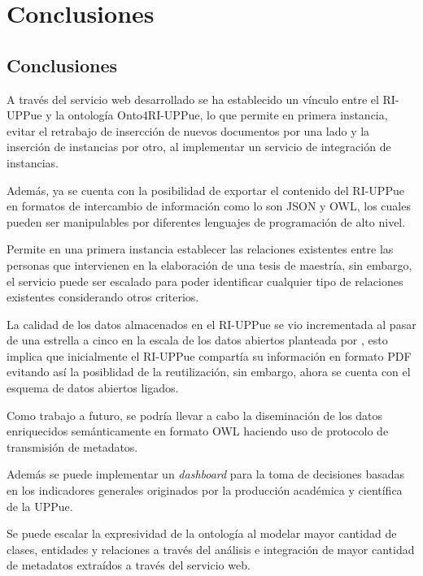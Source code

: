 \renewcommand{\chaptername}{Capitulo}
\chapter{Conclusiones} 
\section{Conclusiones}

A trav\'es del servicio web desarrollado se ha establecido un v\'inculo entre el RI-UPPue y la ontolog\'ia Onto4RI-UPPue, lo que permite en primera instancia, evitar el retrabajo de insercci\'on de nuevos documentos por una lado y la inserci\'on de instancias por otro, al implementar un servicio de integraci\'on de instancias.\newline

Adem\'as, ya se cuenta con la posibilidad de exportar el contenido del RI-UPPue en formatos de intercambio de informaci\'on como lo son JSON y OWL, los cuales pueden ser manipulables por diferentes lenguajes de programaci\'on de alto nivel.\newline

Permite en una primera instancia establecer las relaciones existentes entre las personas que intervienen en la elaboraci\'on de una tesis de maestr\'ia, sin embargo, el servicio puede ser escalado para poder identificar cualquier tipo de relaciones existentes considerando otros criterios.\newline

La calidad de los datos almacenados en el RI-UPPue se vio incrementada al pasar de una estrella a cinco en la escala de los datos abiertos planteada por \cite{CincoEstrellas}, esto implica que inicialmente el RI-UPPue compart\'ia su informaci\'on en formato PDF evitando as\'i la posiblidad de la reutilizaci\'on, sin embargo, ahora se cuenta con el esquema de datos abiertos ligados.\newline

Como trabajo a futuro, se podr\'ia llevar a cabo la diseminaci\'on de los datos enriquecidos sem\'anticamente en formato OWL haciendo uso de protocolo de transmisi\'on de metadatos. \newline

Adem\'as se puede implementar un \textit{dashboard} para la toma de decisiones basadas en los indicadores generales originados por la producci\'on acad\'emica y cient\'ifica de la UPPue.\newline

Se puede escalar la expresividad de la ontolog\'ia al modelar mayor cantidad de clases, entidades y relaciones a trav\'es del an\'alisis e integraci\'on de mayor cantidad de metadatos extra\'idos a trav\'es del servicio web.\newline